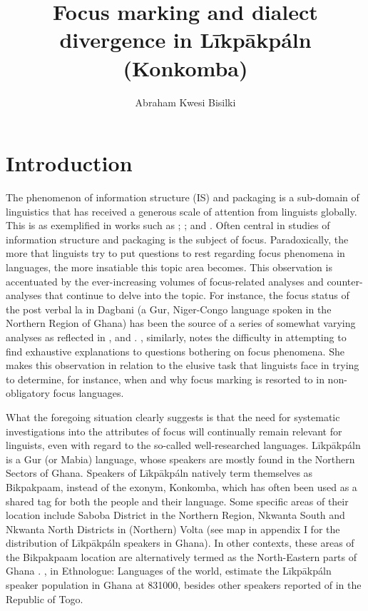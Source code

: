 \documentclass[output=paper,colorlinks,citecolor=brown]{langscibook}
\author{Abraham Kwesi Bisilki\affiliation{University of Education, Winneba, Ghana}}
\title{Focus marking and dialect divergence in Līkpākpáln (Konkomba)}
\begin{document}
\maketitle

\section{Introduction}\label{sec:bisilki:1}

The phenomenon of information structure (IS) and packaging is a sub-domain of linguistics that has received a generous scale of attention from linguists globally. This is as exemplified in works such as \citet{Lambrecht1994, Krifka2007} \citet{Krifka2007}; \citet{SchwabeWinkler2007, Ameka2010, ZimmermannOnea2011}; and \citet{VanPutten2014}. Often central in studies of information structure and packaging is the subject of focus. Paradoxically, the more that linguists try to put questions to rest regarding focus phenomena in languages, the more insatiable this topic area becomes. This observation is accentuated by the ever-increasing volumes of focus-related analyses and counter-analyses that continue to delve into the topic. For instance, the focus status of the post verbal la in Dagbani (a Gur, Niger-Congo language spoken in the Northern Region of Ghana) has been the source of a series of somewhat varying analyses as reflected in \citep{Olawsky1999}, \citet{Hudu2012} and \citet{Issah2013Focus}. \citet[94]{VanPutten2016}, similarly, notes the difficulty in attempting to find exhaustive explanations to questions bothering on focus phenomena. She makes this observation in relation to the elusive task that linguists face in trying to determine, for instance, when and why focus marking is resorted to in non-obligatory focus languages.

What the foregoing situation clearly suggests is that the need for systematic investigations into the attributes of focus will continually remain relevant for linguists, even with regard to the so-called well-researched languages. Līkpākpáln is a Gur (or Mabia) language, whose speakers are mostly found in the Northern Sectors of Ghana. Speakers of Līkpākpáln natively term themselves as Bikpakpaam, instead of the exonym, Konkomba, which has often been used as a shared tag for both the people and their language. Some specific areas of their location include Saboba District in the Northern Region, Nkwanta South and Nkwanta North Districts in (Northern) Volta (see map in appendix I for the distribution of Līkpākpáln speakers in Ghana). In other contexts, these areas of the Bikpakpaam location are alternatively termed as the North-Eastern parts of Ghana \citep[182]{Schwarz2009}. \citet{SimonsFennig2017, SimonsFennig2018}, in Ethnologue: Languages of the world, estimate the Līkpākpáln speaker population in Ghana at 831000, besides other speakers reported of in the Republic of Togo.
\end{document}
